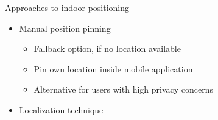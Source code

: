 \documentclass[11pt]{beamer}
\begin{document}
\begin{frame}{Approaches to indoor positioning}

	\begin{itemize}
	
		\item Manual position pinning
		\begin{itemize}
			\setlength{\itemsep}{0.2ex}
			\item Fallback option, if no location available
			\item Pin own location inside mobile application
			\item Alternative for users with high privacy concerns
		\end{itemize}
		
		\item Localization technique
	
	\end{itemize}
	

\end{frame}
\end{document}
